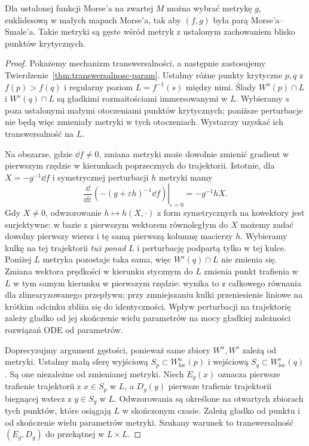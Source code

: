 \begin{twierdzenie}
\label{thm:gen-ms-17}
Dla ustalonej funkcji Morse'a
na zwartej $M$ można wybrać
metrykę $g$, euklidesową w małych
mapach Morse'a, tak aby
$(f,g)$ była parą
Morse'a--Smale'a. Takie metryki
są gęste wśród metryk
z ustalonym zachowaniem
blisko punktów krytycznych.
\end{twierdzenie}
\begin{proof}
Pokażemy mechanizm
transwersalności, a następnie
zastosujemy
Twierdzenie~\ref{thm:transwersalnosc-param}.
Ustalmy różne punkty krytyczne
$p,q$ z $f(p)>f(q)$ i regularny
poziom $L=f^{-1}(s)$ między nimi.
Ślady $W^u(p)\cap L$ i $W^s(q)\cap L$
są gładkimi rozmaitościami immersowanymi w $L$.
Wybieramy $s$ poza ustalonymi małymi otoczeniami
punktów krytycznych; poniższe perturbacje
nie będą więc zmieniały metryki w tych otoczeniach.
Wystarczy uzyskać ich
transwersalność na $L$.

Na obszarze, gdzie $\dd f\ne0$,
zmiana metryki może dowolnie
zmienić gradient w pierwszym
rzędzie w kierunkach poprzecznych
do trajektorii. Istotnie, dla
$X=-g^{-1}\dd f$ i symetrycznej
perturbacji $h$ metryki mamy
\[
 \left.\frac{\dd}{\dd\varepsilon}
  (- (g+\varepsilon h)^{-1}\dd f)
 \right|_{\varepsilon=0}
  =-g^{-1}hX.
\]
Gdy $X\ne0$, odwzorowanie
$h\mapsto h(X,\cdot)$ z form
symetrycznych na kowektory
jest surjektywne: w bazie
z pierwszym wektorem
równoległym do $X$ możemy
zadać dowolny pierwszy
wiersz i tę samą pierwszą
kolumnę macierzy $h$.
Wybieramy kulkę na tej
trajektorii \emph{tuż ponad} $L$
i perturbację podpartą tylko
w tej kulce. Poniżej $L$
metryka pozostaje taka sama,
więc $W^s(q)\cap L$ nie zmienia
się. Zmiana wektora prędkości
w kierunku stycznym do $L$
zmienia punkt trafienia w $L$
w tym samym kierunku
w pierwszym rzędzie: wynika
to z całkowego równania
dla zlinearyzowanego przepływu;
przy zmniejszaniu kulki
przeniesienie liniowe na
krótkim odcinku zbliża się
do identyczności.
Wpływ perturbacji na
trajektorię zależy gładko
od jej skończenie wielu
parametrów na mocy
gładkiej zależności
rozwiązań ODE od parametrów.

Doprecyzujmy argument gęstości, ponieważ same zbiory
$W^u,W^s$ zależą od metryki. Ustalmy małą sferę
wyjściową $S_p\subset W^u_{\mathrm{loc}}(p)$
i wejściową $S_q\subset W^s_{\mathrm{loc}}(q)$.
Są one niezależne od zmienianej metryki.
Niech $E_g(x)$ oznacza pierwsze trafienie trajektorii
z $x\in S_p$ w $L$, a $D_g(y)$ pierwsze trafienie
trajektorii biegnącej wstecz z $y\in S_q$ w $L$.
Odwzorowania są określone na otwartych zbiorach tych punktów,
które osiągają $L$ w skończonym czasie.
Zależą gładko od punktu i od skończenie wielu
parametrów metryki. Szukany warunek to
transwersalność $(E_g,D_g)$ do przekątnej w $L\times L$.


\end{proof}
